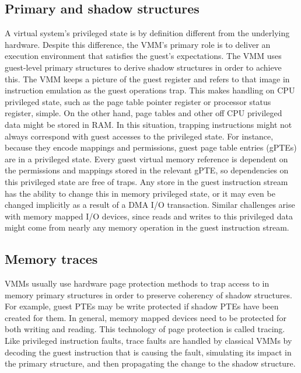\subsection{Primary and shadow structures}
A virtual system's privileged state is by definition
different from the underlying hardware. Despite this
difference, the VMM's primary role is to deliver an
execution environment that satisfies the guest's
expectations. The VMM uses guest-level primary
structures to derive shadow structures in order to achieve
this. The VMM keeps a picture of the guest register and
refers to that image in instruction emulation as the guest
operations trap. This makes handling on CPU privileged
state, such as the page table pointer register or processor
status register, simple. On the other hand, page tables and
other off CPU privileged data might be stored in RAM. In
this situation, trapping instructions might not always
correspond with guest accesses to the privileged state. \newline \newline
For instance, because they encode mappings and
permissions, guest page table entries (gPTEs) are in a
privileged state. Every guest virtual memory reference is
dependent on the permissions and mappings stored in the
relevant gPTE, so dependencies on this privileged state
are free of traps. Any store in the guest instruction stream
has the ability to change this in memory privileged state,
or it may even be changed implicitly as a result of a DMA
I/O transaction. Similar challenges arise with memory
mapped I/O devices, since reads and writes to this
privileged data might come from nearly any memory
operation in the guest instruction stream. 
\subsection{Memory traces}
VMMs usually use hardware page protection methods to
trap access to in memory primary structures in order to
preserve coherency of shadow structures. For example,
guest PTEs may be write protected if shadow PTEs have
been created for them. In general, memory mapped
devices need to be protected for both writing and reading.
This technology of page protection is called tracing. Like
privileged instruction faults, trace faults are handled by
classical VMMs by decoding the guest instruction that is
causing the fault, simulating its impact in the primary
structure, and then propagating the change to the shadow
structure.
